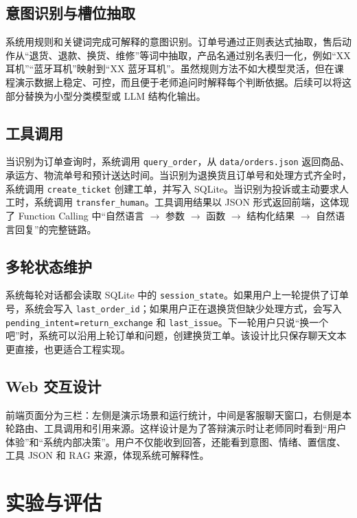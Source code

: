 \documentclass[12pt,a4paper]{ctexart}
\begin{document}
\subsection{意图识别与槽位抽取}

系统用规则和关键词完成可解释的意图识别。订单号通过正则表达式抽取，售后动作从“退货、退款、换货、维修”等词中抽取，产品名通过别名表归一化，例如“XX耳机”“蓝牙耳机”映射到“XX 蓝牙耳机”。虽然规则方法不如大模型灵活，但在课程演示数据上稳定、可控，而且便于老师追问时解释每个判断依据。后续可以将这部分替换为小型分类模型或 LLM 结构化输出。

\subsection{工具调用}

当识别为订单查询时，系统调用 \texttt{query\_order}，从 \texttt{data/orders.json} 返回商品、承运方、物流单号和预计送达时间。当识别为退换货且订单号和处理方式齐全时，系统调用 \texttt{create\_ticket} 创建工单，并写入 SQLite。当识别为投诉或主动要求人工时，系统调用 \texttt{transfer\_human}。工具调用结果以 JSON 形式返回前端，这体现了 Function Calling 中“自然语言 $\to$ 参数 $\to$ 函数 $\to$ 结构化结果 $\to$ 自然语言回复”的完整链路。

\subsection{多轮状态维护}

系统每轮对话都会读取 SQLite 中的 \texttt{session\_state}。如果用户上一轮提供了订单号，系统会写入 \texttt{last\_order\_id}；如果用户正在退换货但缺少处理方式，会写入 \texttt{pending\_intent=return\_exchange} 和 \texttt{last\_issue}。下一轮用户只说“换一个吧”时，系统可以沿用上轮订单和问题，创建换货工单。该设计比只保存聊天文本更直接，也更适合工程实现。

\subsection{Web 交互设计}

前端页面分为三栏：左侧是演示场景和运行统计，中间是客服聊天窗口，右侧是本轮路由、工具调用和引用来源。这样设计是为了答辩演示时让老师同时看到“用户体验”和“系统内部决策”。用户不仅能收到回答，还能看到意图、情绪、置信度、工具 JSON 和 RAG 来源，体现系统可解释性。

\section{实验与评估}
\end{document}
